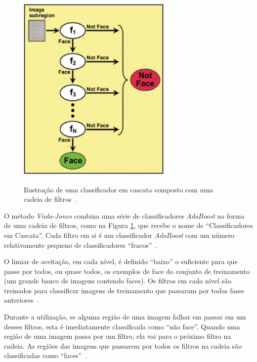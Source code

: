 	\begin{figure}[htb]
		\begin{center}
			\includegraphics[height=10cm,width=7.5cm]{figuras/2.FundamentacaoTeorica/filterchain.png}
		\end{center}
		\caption{Ilustração de uma classificador em cascata composto com uma cadeia de filtros~\cite{servodetection}.}
		\label{filterchain}
	\end{figure}

O método \textit{Viola-Jones} combina uma série de classificadores \textit{AdaBoost} na forma de uma cadeia de filtros, como na Figura \ref{filterchain}, que recebe o nome de ``Classificadores em Cascata''. Cada filtro em si é um classificador \textit{AdaBoost} com um número relativamente pequeno de classificadores ``fracos''~\cite{servodetection}. 

O limiar de aceitação, em cada nível, é definido ``baixo'' o suficiente para que passe por todos, ou quase todos, os exemplos de face do conjunto de treinamento (um grande banco de imagens contendo faces). Os filtros em cada nível são treinados para classificar imagens de treinamento que passaram por todas fases anteriores~\cite{servodetection}.

Durante a utilização, se alguma região de uma imagem falhar em passar em um desses filtros, esta é imediatamente classificada como ``não face''. Quando uma região de uma imagem passa por um filtro, ela vai para o próximo filtro na cadeia. As regiões das imagens que passarem por todos os filtros na cadeia são classificadas como ``faces''~\cite{servodetection}.

